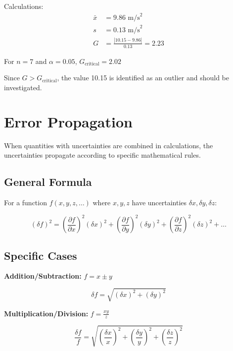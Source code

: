 \documentclass[twoside]{book}
\begin{document}
Calculations:
\begin{align}
\bar{x} &= 9.86 \text{ m/s}^2 \\
s &= 0.13 \text{ m/s}^2 \\
G &= \frac{|10.15 - 9.86|}{0.13} = 2.23
\end{align}

For $n = 7$ and $\alpha = 0.05$, $G_{\text{critical}} = 2.02$

Since $G > G_{\text{critical}}$, the value 10.15 is identified as an outlier and should be investigated.

\section{Error Propagation}

When quantities with uncertainties are combined in calculations, the uncertainties propagate according to specific mathematical rules.

\subsection{General Formula}

For a function $f(x, y, z, \ldots)$ where $x, y, z$ have uncertainties $\delta x, \delta y, \delta z$:

\begin{equation}
(\delta f)^2 = \left(\frac{\partial f}{\partial x}\right)^2(\delta x)^2 + \left(\frac{\partial f}{\partial y}\right)^2(\delta y)^2 + \left(\frac{\partial f}{\partial z}\right)^2(\delta z)^2 + \ldots
\end{equation}

\subsection{Specific Cases}

\textbf{Addition/Subtraction:} $f = x \pm y$

\begin{equation}
\delta f = \sqrt{(\delta x)^2 + (\delta y)^2}
\end{equation}

\textbf{Multiplication/Division:} $f = \frac{xy}{z}$

\begin{equation}
\frac{\delta f}{f} = \sqrt{\left(\frac{\delta x}{x}\right)^2 + \left(\frac{\delta y}{y}\right)^2 + \left(\frac{\delta z}{z}\right)^2}
\end{equation}
\end{document}
